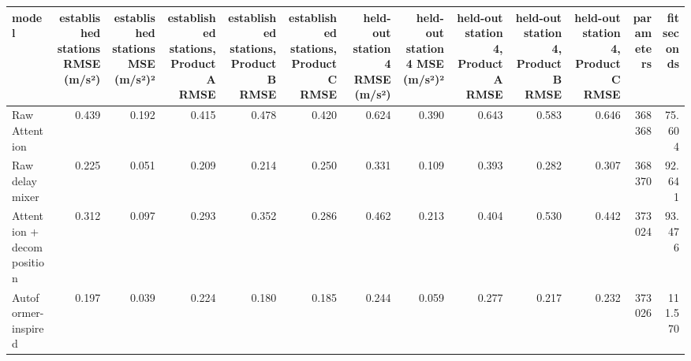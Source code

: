 \begin{tabular}{lrrrrrrrrrrrr}
\toprule
model & established stations RMSE (m/s²) & established stations MSE (m/s²)² & established stations, Product A RMSE & established stations, Product B RMSE & established stations, Product C RMSE & held-out station 4 RMSE (m/s²) & held-out station 4 MSE (m/s²)² & held-out station 4, Product A RMSE & held-out station 4, Product B RMSE & held-out station 4, Product C RMSE & parameters & fit seconds \\
\midrule
Raw Attention & 0.439 & 0.192 & 0.415 & 0.478 & 0.420 & 0.624 & 0.390 & 0.643 & 0.583 & 0.646 & 368368 & 75.604 \\
Raw delay mixer & 0.225 & 0.051 & 0.209 & 0.214 & 0.250 & 0.331 & 0.109 & 0.393 & 0.282 & 0.307 & 368370 & 92.641 \\
Attention + decomposition & 0.312 & 0.097 & 0.293 & 0.352 & 0.286 & 0.462 & 0.213 & 0.404 & 0.530 & 0.442 & 373024 & 93.476 \\
Autoformer-inspired & 0.197 & 0.039 & 0.224 & 0.180 & 0.185 & 0.244 & 0.059 & 0.277 & 0.217 & 0.232 & 373026 & 111.570 \\
\bottomrule
\end{tabular}

